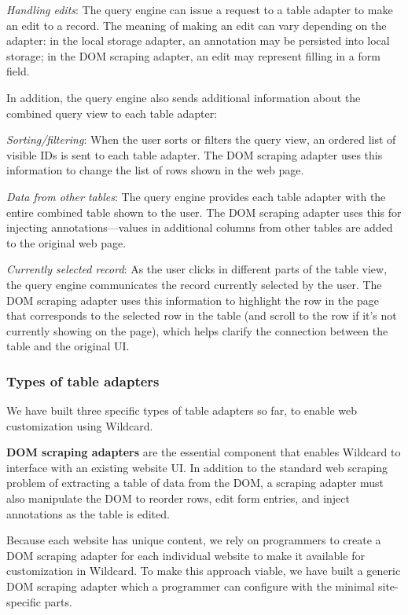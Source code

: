 \documentclass[sigplan,screen,10pt,anonymous,review]{acmart}
\begin{document}
\emph{Handling edits}: The query engine can issue a request to a table
adapter to make an edit to a record. The meaning of making an edit can
vary depending on the adapter: in the local storage adapter, an
annotation may be persisted into local storage; in the DOM scraping
adapter, an edit may represent filling in a form field.

In addition, the query engine also sends additional information about
the combined query view to each table adapter:

\emph{Sorting/filtering}: When the user sorts or filters the query view,
an ordered list of visible IDs is sent to each table adapter. The DOM
scraping adapter uses this information to change the list of rows shown
in the web page.

\emph{Data from other tables}: The query engine provides each table
adapter with the entire combined table shown to the user. The DOM
scraping adapter uses this for injecting annotations---values in
additional columns from other tables are added to the original web page.

\emph{Currently selected record}: As the user clicks in different parts
of the table view, the query engine communicates the record currently
selected by the user. The DOM scraping adapter uses this information to
highlight the row in the page that corresponds to the selected row in
the table (and scroll to the row if it's not currently showing on the
page), which helps clarify the connection between the table and the
original UI.

\hypertarget{types-of-table-adapters}{%
\subsubsection{Types of table adapters}\label{types-of-table-adapters}}

We have built three specific types of table adapters so far, to enable
web customization using Wildcard.

\textbf{DOM scraping adapters} are the essential component that enables
Wildcard to interface with an existing website UI. In addition to the
standard web scraping problem of extracting a table of data from the
DOM, a scraping adapter must also manipulate the DOM to reorder rows,
edit form entries, and inject annotations as the table is edited.

Because each website has unique content, we rely on programmers to
create a DOM scraping adapter for each individual website to make it
available for customization in Wildcard. To make this approach viable,
we have built a generic DOM scraping adapter which a programmer can
configure with the minimal site-specific parts.
\end{document}

